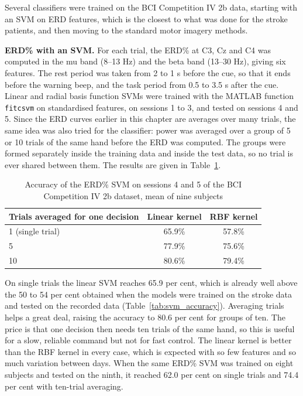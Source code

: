 Several classifiers were trained on the BCI Competition IV 2b data, starting with an SVM
on ERD features, which is the closest to what was done for the stroke patients, and then
moving to the standard motor imagery methods.

\textbf{ERD\% with an SVM.} For each trial, the ERD\% at C3, Cz and C4 was computed in the mu
band (8--13 Hz) and the beta band (13--30 Hz), giving six features. The rest period was
taken from 2 to 1 s before the cue, so that it ends before the warning beep, and the task
period from 0.5 to 3.5 s after the cue. Linear and radial basis function SVMs were trained
with the MATLAB function \texttt{fitcsvm} on standardised features, on sessions 1 to 3, and
tested on sessions 4 and 5. Since the ERD curves earlier in this chapter are averages over
many trials, the same idea was also tried for the classifier: power was averaged over a
group of 5 or 10 trials of the same hand before the ERD was computed. The groups were
formed separately inside the training data and inside the test data, so no trial is ever
shared between them. The results are given in Table~\ref{tab:bci2b_erdsvm}.

\begin{table}[!htbp]
\centering
\caption{Accuracy of the ERD\% SVM on sessions 4 and 5 of the BCI Competition IV 2b dataset, mean of nine subjects}
\label{tab:bci2b_erdsvm}
\begin{tabular}{|l|c|c|}
\hline
\textbf{Trials averaged for one decision} & \textbf{Linear kernel} & \textbf{RBF kernel} \\
\hline
1 (single trial) & 65.9\% & 57.8\% \\
\hline
5 & 77.9\% & 75.6\% \\
\hline
10 & 80.6\% & 79.4\% \\
\hline
\end{tabular}
\end{table}

On single trials the linear SVM reaches 65.9 per cent, which is already well above the 50
to 54 per cent obtained when the models were trained on the stroke data and tested on the
recorded data (Table~\ref{tab:svm_accuracy}). Averaging trials helps a great deal, raising
the accuracy to 80.6 per cent for groups of ten. The price is that one decision then needs
ten trials of the same hand, so this is useful for a slow, reliable command but not for
fast control. The linear kernel is better than the RBF kernel in every case, which is
expected with so few features and so much variation between days. When the same ERD\% SVM
was trained on eight subjects and tested on the ninth, it reached 62.0 per cent on single
trials and 74.4 per cent with ten-trial averaging.

